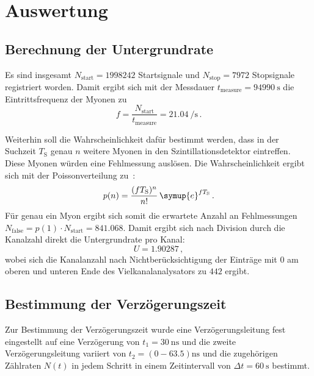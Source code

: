 \section{Auswertung}
\label{sec:Auswertung}

\subsection{Berechnung der Untergrundrate}
\label{sec:unter}
Es sind insgesamt $N_\text{start}=1998242$ Startsignale und
$N_\text{stop}=7972$ Stopsignale registriert worden.
Damit ergibt sich mit der Messdauer $t_\text{measure}=\SI{94990}{\second}$ %
die Eintrittsfrequenz der Myonen zu
\begin{equation*}
	f = \frac{N_\text{start}}{t_\text{measure}}= \SI{21.04}{\per\second} \, \text{.}
\end{equation*}


Weiterhin soll die Wahrscheinlichkeit dafür bestimmt werden, dass in der
Suchzeit $T_\text{S}$ genau $n$ weitere Myonen in den Szintillationsdetektor
eintreffen. Diese Myonen würden eine Fehlmessung auslösen. Die Wahrscheinlichkeit ergibt sich mit der Poissonverteilung zu~\cite{poisson}:
\begin{equation*}
	p(n)=\frac{(f T_\text{S})^n}{n!} \, \symup{e}^{f T_\text{S}} \, \text{.}
\end{equation*}
Für genau ein Myon ergibt sich somit die erwartete Anzahl an Fehlmessungen
$N_\text{false}=p(1) \cdot N_\text{start} =\num{841.068}$. Damit ergibt sich
nach Division durch die Kanalzahl direkt die Untergrundrate pro Kanal:
\begin{equation*}
	U = \num{1.90287} \, \mathrm{,}
\end{equation*}
wobei sich die Kanalanzahl nach Nichtberücksichtigung der Einträge mit \glqq $0$ \grqq{} am oberen und unteren Ende des Vielkanalanalysators zu $442$ ergibt.
\subsection{Bestimmung der Verzögerungszeit}
Zur Bestimmung der Verzögerungszeit wurde eine Verzögerungsleitung fest eingestellt auf eine Verzögerung von $t_1=\SI{30}{\nano\second}$ und die zweite Verzögerungsleitung variiert von $t_2=(\num{0}-\num{63.5})\si{\nano\second}$ und die zugehörigen Zählraten $N(t)$ in jedem Schritt in einem Zeitintervall von $\Delta t=\SI{60}{\second}$ bestimmt.

